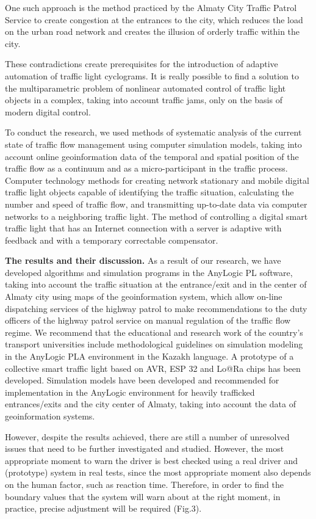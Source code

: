 One such approach is the method practiced by the Almaty City Traffic
Patrol Service to create congestion at the entrances to the city, which
reduces the load on the urban road network and creates the illusion of
orderly traffic within the city.

These contradictions create prerequisites for the introduction of
adaptive automation of traffic light cyclograms. It is really possible
to find a solution to the multiparametric problem of nonlinear automated
control of traffic light objects in a complex, taking into account
traffic jams, only on the basis of modern digital control.

To conduct the research, we used methods of systematic analysis of the
current state of traffic flow management using computer simulation
models, taking into account online geoinformation data of the temporal
and spatial position of the traffic flow as a continuum and as a
micro-participant in the traffic process. Computer technology methods
for creating network stationary and mobile digital traffic light objects
capable of identifying the traffic situation, calculating the number and
speed of traffic flow, and transmitting up-to-date data via computer
networks to a neighboring traffic light. The method of controlling a
digital smart traffic light that has an Internet connection with a
server is adaptive with feedback and with a temporary correctable
compensator.

\textbf{The results and their discussion.} As a result of our research,
we have developed algorithms and simulation programs in the AnyLogic PL
software, taking into account the traffic situation at the entrance/exit
and in the center of Almaty city using maps of the geoinformation
system, which allow on-line dispatching services of the highway patrol
to make recommendations to the duty officers of the highway patrol
service on manual regulation of the traffic flow regime. We recommend
that the educational and research work of the country's transport
universities include methodological guidelines on simulation modeling in
the AnyLogic PLA environment in the Kazakh language. A prototype of a
collective smart traffic light based on AVR, ESP 32 and Lo@Ra chips has
been developed. Simulation models have been developed and recommended
for implementation in the AnyLogic environment for heavily trafficked
entrances/exits and the city center of Almaty, taking into account the
data of geoinformation systems.

However, despite the results achieved, there are still a number of
unresolved issues that need to be further investigated and studied.
However, the most appropriate moment to warn the driver is best checked
using a real driver and (prototype) system in real tests, since the most
appropriate moment also depends on the human factor, such as reaction
time. Therefore, in order to find the boundary values that the system
will warn about at the right moment, in practice, precise adjustment
will be required (Fig.3).

